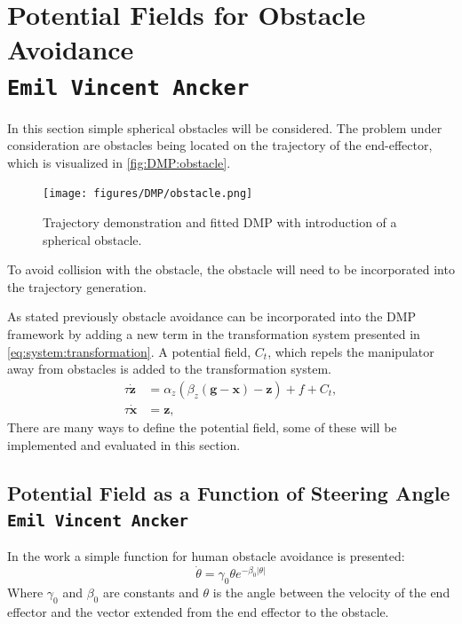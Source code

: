 \documentclass[../main.tex]{subfiles}
\begin{document}
\section{Potential Fields for Obstacle Avoidance  \\ \normalfont\normalsize\texttt{Emil Vincent Ancker}}
\label{sec:avoidance}
In this section simple spherical obstacles will be considered. The problem under consideration are obstacles being located on the trajectory of the end-effector, which is visualized in \autoref{fig:DMP:obstacle}.

\begin{figure}[H]
    \centering
         \texttt{[image: figures/DMP/obstacle.png]}
     \caption{Trajectory demonstration and fitted DMP with introduction of a spherical obstacle.}
     \label{fig:DMP:obstacle}
\end{figure}

To avoid collision with the obstacle, the obstacle will need to be incorporated into the trajectory generation.

As stated previously obstacle avoidance can be incorporated into the DMP framework by adding a new term in the transformation system presented in \autoref{eq:system:transformation}. A potential field, $C_t$, which repels the manipulator away from obstacles is added to the transformation system.
\begin{align} \label{eq:system:transformation}
    \tau \dot{\boldsymbol{z}} &= \alpha_z  (\beta_z ( \boldsymbol{g} - \boldsymbol{x} ) - \boldsymbol{z} ) + f + C_t,\\
    \nonumber \tau \dot{\boldsymbol{x}} &= \boldsymbol{z}, 
\end{align}
There are many ways to define the potential field, some of these will be implemented and evaluated in this section.

\subsection{Potential Field as a Function of Steering Angle \\ \normalfont\normalsize\texttt{Emil Vincent Ancker}}

In the work \cite{warren_behavioral_2010} a simple function for human obstacle avoidance is presented:
\begin{equation} \label{eq:human:avoidance}
    \dot{\theta} = \gamma_0 \theta e^{-\beta_0|\theta|}
\end{equation}
Where $\gamma_0$ and $\beta_0$ are constants and $\theta$ is the angle between the velocity of the end effector and the vector extended from the end effector to the obstacle.
\end{document}
